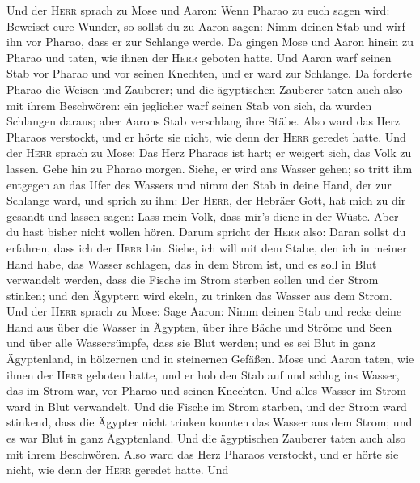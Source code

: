  Und der \textsc{Herr} sprach zu Mose und Aaron:
 Wenn Pharao zu euch sagen wird: Beweiset eure Wunder, so
sollst du zu Aaron sagen: Nimm deinen Stab und wirf ihn vor Pharao, dass
er zur Schlange werde.  Da gingen Mose und Aaron hinein
zu Pharao und taten, wie ihnen der \textsc{Herr} geboten hatte. Und
Aaron warf seinen Stab vor Pharao und vor seinen Knechten, und er ward
zur Schlange.  Da forderte Pharao die Weisen und
Zauberer; und die ägyptischen Zauberer taten auch also mit ihrem
Beschwören:  ein jeglicher warf seinen Stab von sich, da
wurden Schlangen daraus; aber Aarons Stab verschlang ihre Stäbe.
 Also ward das Herz Pharaos verstockt, und er hörte sie
nicht, wie denn der \textsc{Herr} geredet hatte.  Und der
\textsc{Herr} sprach zu Mose: Das Herz Pharaos ist hart; er weigert
sich, das Volk zu lassen.  Gehe hin zu Pharao morgen.
Siehe, er wird ans Wasser gehen; so tritt ihm entgegen an das Ufer des
Wassers und nimm den Stab in deine Hand, der zur Schlange ward,
 und sprich zu ihm: Der \textsc{Herr}, der Hebräer Gott,
hat mich zu dir gesandt und lassen sagen: Lass mein Volk, dass mir's
diene in der Wüste. Aber du hast bisher nicht wollen hören.
 Darum spricht der \textsc{Herr} also: Daran sollst du
erfahren, dass ich der \textsc{Herr} bin. Siehe, ich will mit dem Stabe,
den ich in meiner Hand habe, das Wasser schlagen, das in dem Strom ist,
und es soll in Blut verwandelt werden,  dass die Fische
im Strom sterben sollen und der Strom stinken; und den Ägyptern wird
ekeln, zu trinken das Wasser aus dem Strom.  Und der
\textsc{Herr} sprach zu Mose: Sage Aaron: Nimm deinen Stab und recke
deine Hand aus über die Wasser in Ägypten, über ihre Bäche und Ströme
und Seen und über alle Wassersümpfe, dass sie Blut werden; und es sei
Blut in ganz Ägyptenland, in hölzernen und in steinernen Gefäßen.
 Mose und Aaron taten, wie ihnen der \textsc{Herr}
geboten hatte, und er hob den Stab auf und schlug ins Wasser, das im
Strom war, vor Pharao und seinen Knechten. Und alles Wasser im Strom
ward in Blut verwandelt.  Und die Fische im Strom
starben, und der Strom ward stinkend, dass die Ägypter nicht trinken
konnten das Wasser aus dem Strom; und es war Blut in ganz Ägyptenland.
 Und die ägyptischen Zauberer taten auch also mit ihrem
Beschwören. Also ward das Herz Pharaos verstockt, und er hörte sie
nicht, wie denn der \textsc{Herr} geredet hatte.  Und
